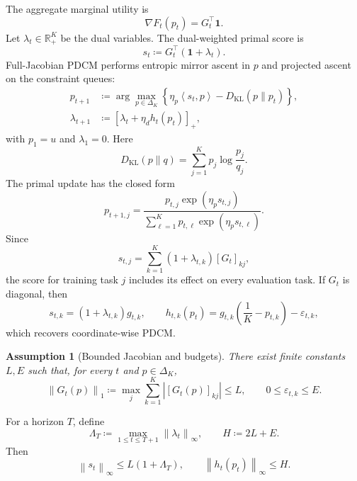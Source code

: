 \documentclass[11pt]{article}
\newtheorem{assumption}{Assumption}
\newcommand{\R}{\mathbb{R}}
\newcommand{\DeltaK}{\Delta_K}
\newcommand{\KL}{D_{\mathrm{KL}}}
\newcommand{\one}{\mathbf{1}}
\newcommand{\pos}[1]{\left[#1\right]_+}
\newcommand{\ip}[2]{\left\langle #1,#2\right\rangle}
\newcommand{\norm}[1]{\left\lVert #1\right\rVert}
\begin{document}
The aggregate marginal utility is
\begin{equation}
    \nabla F_t(p_t)=G_t^\top\one.
    \label{eq:grad-F}
\end{equation}
Let $\lambda_t\in\R_+^K$ be the dual variables. The dual-weighted primal score is
\begin{equation}
    s_t
    \coloneqq
    G_t^\top(\one+\lambda_t).
    \label{eq:s}
\end{equation}
Full-Jacobian PDCM performs entropic mirror ascent in $p$ and projected ascent on the constraint queues:
\begin{align}
    p_{t+1}
    &\coloneqq
    \arg\max_{p\in\DeltaK}
    \left\{
        \eta_p\ip{s_t}{p}-\KL(p\|p_t)
    \right\},
    \label{eq:p-update}\\
    \lambda_{t+1}
    &\coloneqq
    \pos{\lambda_t+\eta_d h_t(p_t)},
    \label{eq:lambda-update}
\end{align}
with $p_1=u$ and $\lambda_1=0$. Here
\[
    \KL(p\|q)=\sum_{j=1}^K p_j\log\frac{p_j}{q_j}.
\]
The primal update has the closed form
\begin{equation}
    p_{t+1,j}
    =
    \frac{p_{t,j}\exp(\eta_p s_{t,j})}
    {\sum_{\ell=1}^Kp_{t,\ell}\exp(\eta_p s_{t,\ell})}.
    \label{eq:softmax-update}
\end{equation}
Since
\begin{equation}
    s_{t,j}
    =
    \sum_{k=1}^K
    (1+\lambda_{t,k})[G_t]_{kj},
    \label{eq:cross-task-score}
\end{equation}
the score for training task $j$ includes its effect on every evaluation task. If $G_t$ is diagonal, then
\[
    s_{t,k}=(1+\lambda_{t,k})g_{t,k},
    \qquad
    h_{t,k}(p_t)=g_{t,k}\left(\frac1K-p_{t,k}\right)-\varepsilon_{t,k},
\]
which recovers coordinate-wise PDCM.

\begin{assumption}[Bounded Jacobian and budgets]
\label{ass:bounded}
There exist finite constants $L,E$ such that, for every $t$ and $p\in\DeltaK$,
\begin{equation}
    \norm{G_t(p)}_1
    \coloneqq
    \max_j\sum_{k=1}^K|[G_t(p)]_{kj}|
    \le L,
    \qquad
    0\le\varepsilon_{t,k}\le E.
    \label{eq:bounded}
\end{equation}
\end{assumption}

For a horizon $T$, define
\begin{equation}
    \Lambda_T
    \coloneqq
    \max_{1\le t\le T+1}\norm{\lambda_t}_\infty,
    \qquad
    H\coloneqq2L+E.
    \label{eq:constants}
\end{equation}
Then
\begin{equation}
    \norm{s_t}_\infty\le L(1+\Lambda_T),
    \qquad
    \norm{h_t(p_t)}_\infty\le H.
    \label{eq:basic-bounds}
\end{equation}
\end{document}
